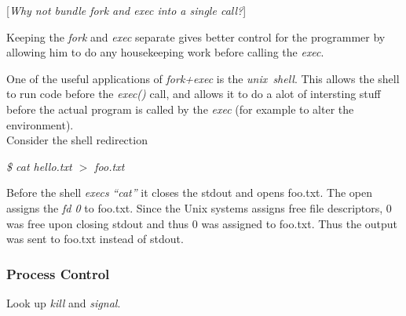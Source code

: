 \documentclass[11pt]{article}
\begin{document}
[\emph{Why not bundle fork and exec into a single call?}]

Keeping the \emph{fork} and \emph{exec} separate gives better control for the
programmer by allowing him to do any housekeeping work before calling the
\emph{exec}.

One of the useful applications of \emph{fork+exec} is the
\emph{unix~shell}. This allows the shell to run code before the \emph{exec()}
call, and allows it to do a alot of intersting stuff before the actual program
is called by the \emph{exec} (for example to alter the environment).
\\[8pt]
Consider the shell redirection

\emph{\$ cat hello.txt \(>\) foo.txt}

Before the shell \emph{execs} \emph{``cat''} it closes the stdout and opens
foo.txt. The open assigns the \emph{fd 0} to foo.txt. Since the Unix systems
assigns free file descriptors, 0 was free upon closing stdout and thus 0 was
assigned to foo.txt. Thus the output was sent to foo.txt instead of stdout.

\subsubsection*{Process Control}
Look up \emph{kill} and \emph{signal}.
\end{document}
